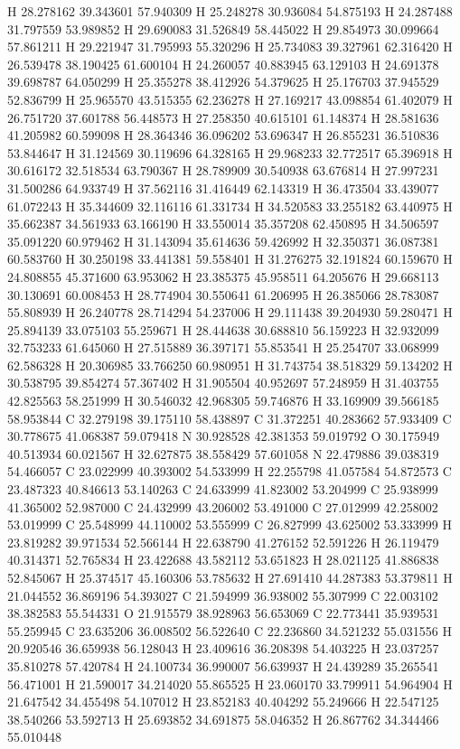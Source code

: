 \documentclass{article}
\begin{document}
H 28.278162 39.343601 57.940309 
H 25.248278 30.936084 54.875193 
H 24.287488 31.797559 53.989852 
H 29.690083 31.526849 58.445022 
H 29.854973 30.099664 57.861211 
H 29.221947 31.795993 55.320296 
H 25.734083 39.327961 62.316420 
H 26.539478 38.190425 61.600104 
H 24.260057 40.883945 63.129103 
H 24.691378 39.698787 64.050299 
H 25.355278 38.412926 54.379625 
H 25.176703 37.945529 52.836799 
H 25.965570 43.515355 62.236278 
H 27.169217 43.098854 61.402079 
H 26.751720 37.601788 56.448573 
H 27.258350 40.615101 61.148374 
H 28.581636 41.205982 60.599098 
H 28.364346 36.096202 53.696347 
H 26.855231 36.510836 53.844647 
H 31.124569 30.119696 64.328165 
H 29.968233 32.772517 65.396918 
H 30.616172 32.518534 63.790367 
H 28.789909 30.540938 63.676814 
H 27.997231 31.500286 64.933749 
H 37.562116 31.416449 62.143319 
H 36.473504 33.439077 61.072243 
H 35.344609 32.116116 61.331734 
H 34.520583 33.255182 63.440975 
H 35.662387 34.561933 63.166190 
H 33.550014 35.357208 62.450895 
H 34.506597 35.091220 60.979462 
H 31.143094 35.614636 59.426992 
H 32.350371 36.087381 60.583760 
H 30.250198 33.441381 59.558401 
H 31.276275 32.191824 60.159670 
H 24.808855 45.371600 63.953062 
H 23.385375 45.958511 64.205676 
H 29.668113 30.130691 60.008453 
H 28.774904 30.550641 61.206995 
H 26.385066 28.783087 55.808939 
H 26.240778 28.714294 54.237006 
H 29.111438 39.204930 59.280471 
H 25.894139 33.075103 55.259671 
H 28.444638 30.688810 56.159223 
H 32.932099 32.753233 61.645060 
H 27.515889 36.397171 55.853541 
H 25.254707 33.068999 62.586328 
H 20.306985 33.766250 60.980951 
H 31.743754 38.518329 59.134202 
H 30.538795 39.854274 57.367402 
H 31.905504 40.952697 57.248959 
H 31.403755 42.825563 58.251999 
H 30.546032 42.968305 59.746876 
H 33.169909 39.566185 58.953844 
C 32.279198 39.175110 58.438897 
C 31.372251 40.283662 57.933409 
C 30.778675 41.068387 59.079418 
N 30.928528 42.381353 59.019792 
O 30.175949 40.513934 60.021567 
H 32.627875 38.558429 57.601058 
N 22.479886 39.038319 54.466057 
C 23.022999 40.393002 54.533999 
H 22.255798 41.057584 54.872573 
C 23.487323 40.846613 53.140263 
C 24.633999 41.823002 53.204999 
C 25.938999 41.365002 52.987000 
C 24.432999 43.206002 53.491000 
C 27.012999 42.258002 53.019999 
C 25.548999 44.110002 53.555999 
C 26.827999 43.625002 53.333999 
H 23.819282 39.971534 52.566144 
H 22.638790 41.276152 52.591226 
H 26.119479 40.314371 52.765834 
H 23.422688 43.582112 53.651823 
H 28.021125 41.886838 52.845067 
H 25.374517 45.160306 53.785632 
H 27.691410 44.287383 53.379811 
H 21.044552 36.869196 54.393027 
C 21.594999 36.938002 55.307999 
C 22.003102 38.382583 55.544331 
O 21.915579 38.928963 56.653069 
C 22.773441 35.939531 55.259945 
C 23.635206 36.008502 56.522640 
C 22.236860 34.521232 55.031556 
H 20.920546 36.659938 56.128043 
H 23.409616 36.208398 54.403225 
H 23.037257 35.810278 57.420784 
H 24.100734 36.990007 56.639937 
H 24.439289 35.265541 56.471001 
H 21.590017 34.214020 55.865525 
H 23.060170 33.799911 54.964904 
H 21.647542 34.455498 54.107012 
H 23.852183 40.404292 55.249666 
H 22.547125 38.540266 53.592713 
H 25.693852 34.691875 58.046352 
H 26.867762 34.344466 55.010448 
~     

\newpage
\end{document}
